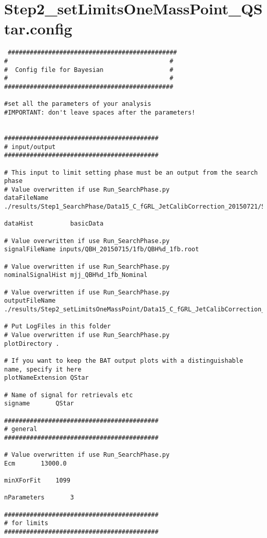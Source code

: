 \documentclass[UKenglish]{latex/atlasdoc}
\begin{document}
\section{Step2\_setLimitsOneMassPoint\_QStar.config}
\label{app:limitconfig}

\begin{verbatim} ##############################################
#                                            #
#  Config file for Bayesian                  #
#                                            #
##############################################

#set all the parameters of your analysis
#IMPORTANT: don't leave spaces after the parameters!

	
##########################################
# input/output
##########################################

# This input to limit setting phase must be an output from the search phase
# Value overwritten if use Run_SearchPhase.py
dataFileName ./results/Step1_SearchPhase/Data15_C_fGRL_JetCalibCorrection_20150721/Step1_SearchPhase_mjj_Data_PeriodC_0p072fb.root

dataHist          basicData

# Value overwritten if use Run_SearchPhase.py
signalFileName inputs/QBH_20150715/1fb/QBH%d_1fb.root

# Value overwritten if use Run_SearchPhase.py
nominalSignalHist mjj_QBH%d_1fb_Nominal

# Value overwritten if use Run_SearchPhase.py
outputFileName ./results/Step2_setLimitsOneMassPoint/Data15_C_fGRL_JetCalibCorrection_20150721/Step2_setLimitsOneMassPoint_QBH5000_0p072fb.root

# Put LogFiles in this folder
# Value overwritten if use Run_SearchPhase.py
plotDirectory .

# If you want to keep the BAT output plots with a distinguishable name, specify it here
plotNameExtension QStar

# Name of signal for retrievals etc
signame		  QStar

##########################################
# general
##########################################

# Value overwritten if use Run_SearchPhase.py
Ecm		  13000.0

minXForFit	  1099

nParameters       3

##########################################
# for limits
##########################################


\end{verbatim}
\end{document}
